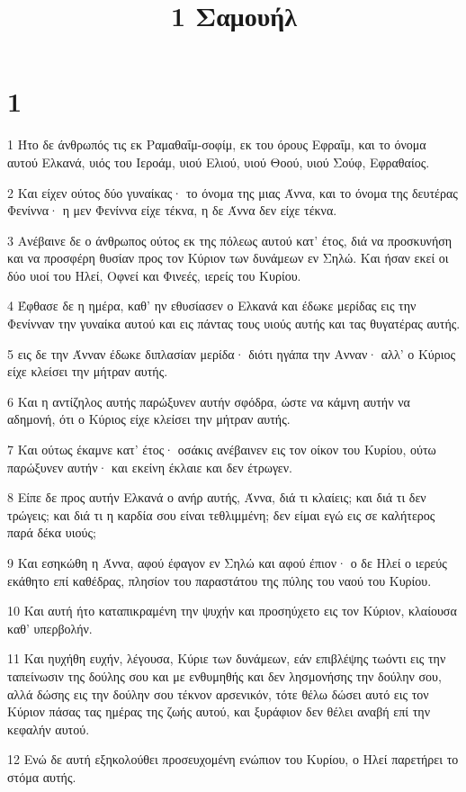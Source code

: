 

\title{1 Σαμουήλ}


\chapter{1}

\par 1 Ήτο δε άνθρωπός τις εκ Ραμαθαΐμ-σοφίμ, εκ του όρους Εφραΐμ, και το όνομα αυτού Ελκανά, υιός του Ιεροάμ, υιού Ελιού, υιού Θοού, υιού Σούφ, Εφραθαίος.
\par 2 Και είχεν ούτος δύο γυναίκας· το όνομα της μιας Άννα, και το όνομα της δευτέρας Φενίννα· η μεν Φενίννα είχε τέκνα, η δε Άννα δεν είχε τέκνα.
\par 3 Ανέβαινε δε ο άνθρωπος ούτος εκ της πόλεως αυτού κατ' έτος, διά να προσκυνήση και να προσφέρη θυσίαν προς τον Κύριον των δυνάμεων εν Σηλώ. Και ήσαν εκεί οι δύο υιοί του Ηλεί, Οφνεί και Φινεές, ιερείς του Κυρίου.
\par 4 Έφθασε δε η ημέρα, καθ' ην εθυσίασεν ο Ελκανά και έδωκε μερίδας εις την Φενίνναν την γυναίκα αυτού και εις πάντας τους υιούς αυτής και τας θυγατέρας αυτής.
\par 5 εις δε την Άνναν έδωκε διπλασίαν μερίδα· διότι ηγάπα την Ανναν· αλλ' ο Κύριος είχε κλείσει την μήτραν αυτής.
\par 6 Και η αντίζηλος αυτής παρώξυνεν αυτήν σφόδρα, ώστε να κάμνη αυτήν να αδημονή, ότι ο Κύριος είχε κλείσει την μήτραν αυτής.
\par 7 Και ούτως έκαμνε κατ' έτος· οσάκις ανέβαινεν εις τον οίκον του Κυρίου, ούτω παρώξυνεν αυτήν· και εκείνη έκλαιε και δεν έτρωγεν.
\par 8 Είπε δε προς αυτήν Ελκανά ο ανήρ αυτής, Άννα, διά τι κλαίεις; και διά τι δεν τρώγεις; και διά τι η καρδία σου είναι τεθλιμμένη; δεν είμαι εγώ εις σε καλήτερος παρά δέκα υιούς;
\par 9 Και εσηκώθη η Άννα, αφού έφαγον εν Σηλώ και αφού έπιον· ο δε Ηλεί ο ιερεύς εκάθητο επί καθέδρας, πλησίον του παραστάτου της πύλης του ναού του Κυρίου.
\par 10 Και αυτή ήτο καταπικραμένη την ψυχήν και προσηύχετο εις τον Κύριον, κλαίουσα καθ' υπερβολήν.
\par 11 Και ηυχήθη ευχήν, λέγουσα, Κύριε των δυνάμεων, εάν επιβλέψης τωόντι εις την ταπείνωσιν της δούλης σου και με ενθυμηθής και δεν λησμονήσης την δούλην σου, αλλά δώσης εις την δούλην σου τέκνον αρσενικόν, τότε θέλω δώσει αυτό εις τον Κύριον πάσας τας ημέρας της ζωής αυτού, και ξυράφιον δεν θέλει αναβή επί την κεφαλήν αυτού.
\par 12 Ενώ δε αυτή εξηκολούθει προσευχομένη ενώπιον του Κυρίου, ο Ηλεί παρετήρει το στόμα αυτής.
